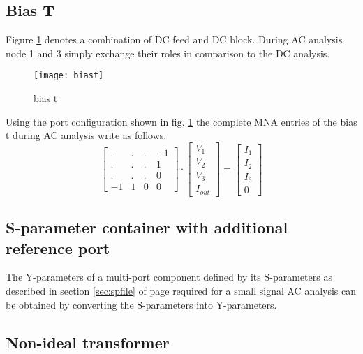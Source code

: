 \subsection{Bias T}

Figure \ref{fig:ACbiast} denotes a combination of DC feed and DC
block.  During AC analysis node 1 and 3 simply exchange their roles in
comparison to the DC analysis.

\begin{figure}[ht]
\begin{center}
\texttt{[image: biast]}
\end{center}
\caption{bias t}
\label{fig:ACbiast}
\end{figure}
\FloatBarrier

Using the port configuration shown in fig. \ref{fig:ACbiast} the
complete MNA entries of the bias t during AC analysis write as
follows.
\begin{equation}
\begin{bmatrix}
 . & . & .  & -1\\
 . & . & .  &  1\\
 . & . & .  &  0\\
-1 & 1 & 0  &  0
\end{bmatrix}
\cdot
\begin{bmatrix}
V_{1}\\
V_{2}\\
V_{3}\\
I_{out}
\end{bmatrix}
=
\begin{bmatrix}
I_{1}\\
I_{2}\\
I_{3}\\
0
\end{bmatrix}
\end{equation}

\subsection{S-parameter container with additional reference port}

The Y-parameters of a multi-port component defined by its S-parameters
as described in section \ref{sec:spfile} of page \pageref{sec:spfile}
required for a small signal AC analysis can be obtained by converting
the S-parameters into Y-parameters.

\subsection{Non-ideal transformer}

